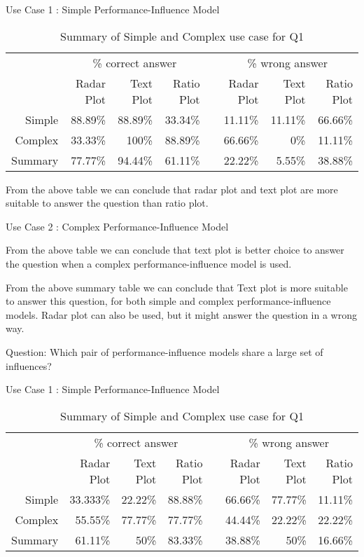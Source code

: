 \newline
Use Case 1 : Simple Performance-Influence Model

\begin{table*}[htbp]
\begin{tabular}{@{}rrrrcrrr@{}}\toprule
    & \multicolumn{3}{c}{\% correct answer} & \phantom{abc}& \multicolumn{3}{c}{\% wrong answer} \\
\cmidrule{2-4} \cmidrule{6-8} \cmidrule{10-12}
& Radar Plot & Text Plot & Ratio Plot && Radar Plot & Text Plot & Ratio Plot \\ \midrule
Simple & 88.89\% & 88.89\% & 33.34\% && 11.11\% & 11.11\% & 66.66\% \\
Complex & 33.33\% & 100\% & 88.89\% && 66.66\% & 0\% & 11.11\%\\
\toprule
Summary & 77.77\% & 94.44\% & 61.11\% && 22.22\% & 5.55\% & 38.88\%\\
\bottomrule
\end{tabular}
\caption{Summary of Simple and Complex use case for Q1}
\end{table*}


From the above table we can conclude that radar plot and text plot are more suitable to answer the question than ratio plot.

Use Case 2 : Complex Performance-Influence Model



From the above table we can conclude that text plot is better choice to answer the question when a complex performance-influence model is used.


From the above summary table we can conclude that Text plot is more suitable to answer this question, for both simple and complex performance-influence models. Radar plot can also be used, but it might answer the question in a wrong way.

Question: Which pair of performance-influence models share a large set of influences?

Use Case 1 : Simple Performance-Influence Model

\begin{table*}[htbp]
\begin{tabular}{@{}rrrrcrrr@{}}\toprule
    & \multicolumn{3}{c}{\% correct answer} & \phantom{abc}& \multicolumn{3}{c}{\% wrong answer} \\
\cmidrule{2-4} \cmidrule{6-8} \cmidrule{10-12}
& Radar Plot & Text Plot & Ratio Plot && Radar Plot & Text Plot & Ratio Plot \\ \midrule
Simple & 33.333\% & 22.22\% & 88.88\% && 66.66\% & 77.77\% & 11.11\% \\
Complex & 55.55\% & 77.77\% & 77.77\% && 44.44\% & 22.22\% & 22.22\%\\
\toprule
Summary & 61.11\% & 50\% & 83.33\% && 38.88\% & 50\% & 16.66\%\\
\bottomrule
\end{tabular}
\caption{Summary of Simple and Complex use case for Q1}
\end{table*}



